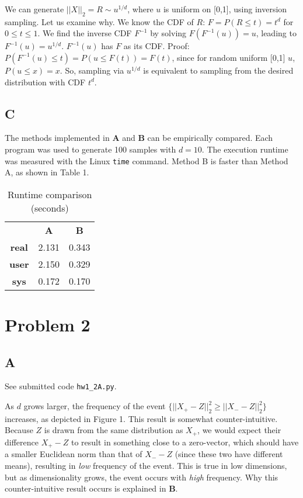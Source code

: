 \documentclass{report}
\begin{document}
We can generate $||X||_2 = R \sim u^{1/d}$, where $u$ is uniform on [0,1], using inversion
sampling. Let us examine why. We know the CDF of $R$: $F = P(R \leq t) = t^d$ for $0
\leq t \leq 1$. We find the inverse CDF $F^{-1}$ by solving $F(F^{-1}(u))=u$,
leading to $F^{-1}(u) = u^{1/d}$. $F^{-1}(u)$ has $F$ as its CDF. Proof:
$P(F^{-1}(u) \leq t) = P(u \leq F(t)) = F(t)$, since for random uniform [0,1]
$u$, $P(u \leq x) = x$. So, sampling via $u^{1/d}$ is equivalent to sampling from
the desired distribution with CDF $t^d$.

\subsection*{C}

The methods implemented in \textbf{A} and \textbf{B} can be empirically
compared. Each program was used to generate 100 samples with $d=10$. The
execution runtime was measured with the Linux \texttt{time} command. Method B is faster than Method
A, as shown in Table 1.

	\begin{table}[h]
		\centering
		\caption{Runtime comparison (seconds)}
		\begin{tabular}{|c c c|}
			\hline
			& \textbf{A} & \textbf{B} \\
			\textbf{real} & 2.131 & 0.343\\
			\textbf{user} & 2.150 & 0.329\\
			\textbf{sys}  & 0.172 & 0.170\\
			\hline
		\end{tabular}
	\end{table}

\section*{Problem 2}

\subsection*{A}

See submitted code \texttt{hw1\_2A.py}. 

As $d$ grows larger, the frequency of the event $\{||X_+ -
Z||^2_2 \geq ||X_{-} - Z||_2^2\}$ increases, as depicted in Figure 1. This
result is somewhat counter-intuitive.
Because $Z$ is drawn from the same distribution as $X_+$, we would expect their
difference $X_+ - Z$ to result in something close to a zero-vector, which should
have a smaller Euclidean norm than that of $X_- - Z$
(since these two have different
means), resulting in \textit{low} frequency of the event. This is true in low
dimensions, but as dimensionality grows, the event occurs with \textit{high}
frequency. Why this counter-intuitive result occurs is explained in \textbf{B}.
\end{document}
